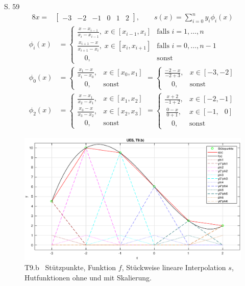 \documentclass[10pt,a4paper]{article}
\begin{document}
	S. 59
	\begin{alignat*}{8}
	x =& \begin{bmatrix}-3 & -2 & -1 &0& 1& 2 \end{bmatrix}, \qquad s(x)=\sum_{i=0}^{n}y_i\phi_i(x)
	\end{alignat*}
	\begin{align*}
	\phi_i(x) &= \begin{cases}
	\frac{x-x_{i-1}}{x_i-x_{i-1}}, \; x \in [x_{i-1}, x_i] & \text{falls } i=1,\dots, n\\
	\frac{x_{i+1}-x}{x_{i+1}-x_i}, \; x \in [x_i, x_{i+1}] & \text{falls } i=0,\dots, n-1\\
	\quad 0, & \text{sonst}
	\end{cases} \\
	\phi_0(x) &= \begin{cases}
	\frac{x_{1}-x}{x_{1}-x_0}, & x \in [x_0, x_{1}] \\
	\quad\! 0, & \text{sonst}
	\end{cases} =
	\begin{cases}
	\frac{-2-x}{-2+3}, & x \in [-3, -2] \\
	\quad\! 0, & \text{sonst}
	\end{cases}
	\\
	\phi_2(x) &= \begin{cases}
	\frac{x-x_{1}}{x_2-x_{1}}, & x \in [x_{1}, x_2] \\
	\frac{x_{3}-x}{x_{3}-x_2}, & x \in [x_2, x_{3}] \\
	\quad 0, & \text{sonst}
	\end{cases}
	= \begin{cases}
	\frac{x+2}{-1+2}, & x \in [-2, -1]\\
	\:\frac{0-x}{0+1}, & x \in [-1, \;\;\,0] \\
	\quad 0, & \text{sonst}
	\end{cases}
	\end{align*}
	\begin{figure}[htbp]
		\centering
		\includegraphics[width=1.0\textwidth]{T9b}
		\caption{T9.b \, Stützpunkte, Funktion $f$, Stückweise lineare Interpolation $s$, Hutfunktionen ohne und mit Skalierung.}
	\end{figure}
	
\end{document}
